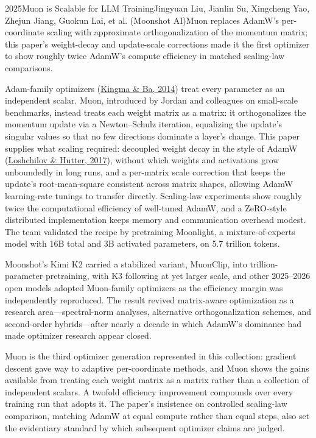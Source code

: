 
\begin{papersummary}{2025}{Muon is Scalable for LLM Training}{Jingyuan Liu, Jianlin Su, Xingcheng Yao, Zhejun Jiang, Guokun Lai, et al. (Moonshot AI)}{Muon replaces AdamW's per-coordinate scaling with approximate orthogonalization of the momentum matrix; this paper's weight-decay and update-scale corrections made it the first optimizer to show roughly twice AdamW's compute efficiency in matched scaling-law comparisons.}

Adam-family optimizers (\hyperref[paper:kingma-ba-2014]{Kingma \& Ba, 2014}) treat every parameter as an independent scalar. Muon, introduced by Jordan and colleagues on small-scale benchmarks, instead treats each weight matrix as a matrix: it orthogonalizes the momentum update via a Newton--Schulz iteration, equalizing the update's singular values so that no few directions dominate a layer's change. This paper supplies what scaling required: decoupled weight decay in the style of AdamW (\hyperref[paper:loshchilov-2017-adamw]{Loshchilov \& Hutter, 2017}), without which weights and activations grow unboundedly in long runs, and a per-matrix scale correction that keeps the update's root-mean-square consistent across matrix shapes, allowing AdamW learning-rate tunings to transfer directly. Scaling-law experiments show roughly twice the computational efficiency of well-tuned AdamW, and a ZeRO-style distributed implementation keeps memory and communication overhead modest. The team validated the recipe by pretraining Moonlight, a mixture-of-experts model with 16B total and 3B activated parameters, on 5.7 trillion tokens.

Moonshot's Kimi K2 carried a stabilized variant, MuonClip, into trillion-parameter pretraining, with K3 following at yet larger scale, and other 2025--2026 open models adopted Muon-family optimizers as the efficiency margin was independently reproduced. The result revived matrix-aware optimization as a research area---spectral-norm analyses, alternative orthogonalization schemes, and second-order hybrids---after nearly a decade in which AdamW's dominance had made optimizer research appear closed.

Muon is the third optimizer generation represented in this collection: gradient descent gave way to adaptive per-coordinate methods, and Muon shows the gains available from treating each weight matrix as a matrix rather than a collection of independent scalars. A twofold efficiency improvement compounds over every training run that adopts it. The paper's insistence on controlled scaling-law comparison, matching AdamW at equal compute rather than equal steps, also set the evidentiary standard by which subsequent optimizer claims are judged.

\end{papersummary}
